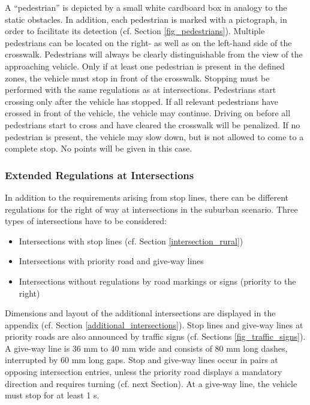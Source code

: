 A “pedestrian” is depicted by a small white cardboard box in analogy to the
static obstacles. In addition, each pedestrian is marked with a pictograph, in
order to facilitate its detection (cf. Section \ref{fig_pedestrians}). Multiple
pedestrians can be located on the right- as well as on the left-hand side of
the crosswalk. Pedestrians will always be clearly distinguishable from the view
of the approaching vehicle. Only if at least one pedestrian is present in the
defined zones, the vehicle must stop in front of the crosswalk. Stopping must
be performed with the same regulations as at intersections. Pedestrians start
crossing only after the vehicle has stopped. If all relevant pedestrians have
crossed in front of the vehicle, the vehicle may continue. Driving on before
all pedestrians start to cross and have cleared the crosswalk will be
penalized. If no pedestrian is present, the vehicle may slow down, but is not
allowed to come to a complete stop. No points will be given in this case.

\subsubsection{Extended Regulations at Intersections}

In addition to the requirements arising from stop lines, there can be different
regulations for the right of way at intersections in the suburban scenario.
Three types of intersections have to be considered:

\begin{itemize}
	\item Intersections with stop lines (cf. Section \ref{intersection_rural})
	\item Intersections with priority road and give-way lines
	\item Intersections without regulations by road markings or signs (priority to the
	      right)
\end{itemize}

Dimensions and layout of the additional intersections are displayed in the
appendix (cf. Section \ref{additional_intersections}). Stop lines and give-way
lines at priority roads are also announced by traffic signs (cf. Sections
\ref{fig_traffic_signs}). A give-way line is 36 mm to 40 mm wide and consists
of 80 mm long dashes, interrupted by 60 mm long gaps. Stop and give-way lines
occur in pairs at opposing intersection entries, unless the priority road
displays a mandatory direction and requires turning (cf. next Section). At a
give-way line, the vehicle must stop for at least 1 s.

